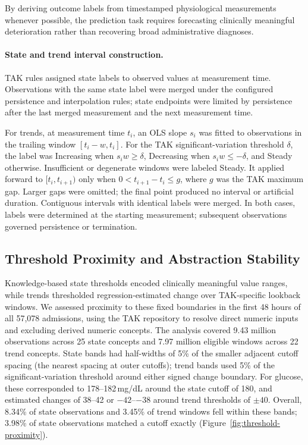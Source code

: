 By deriving outcome labels from timestamped physiological measurements whenever possible, the prediction task requires forecasting clinically meaningful deterioration rather than recovering broad administrative diagnoses.

\paragraph{State and trend interval construction.}
\label{app:abstraction-construction}
TAK rules assigned state labels to observed values at measurement time. Observations with the same state label were merged under the configured persistence and interpolation rules; state endpoints were limited by persistence after the last merged measurement and the next measurement time.

For trends, at measurement time $t_i$, an OLS slope $s_i$ was fitted to observations in the trailing window $[t_i-w,t_i]$. For the TAK significant-variation threshold $\delta$, the label was Increasing when $s_iw\ge\delta$, Decreasing when $s_iw\le-\delta$, and Steady otherwise. Insufficient or degenerate windows were labeled Steady. It applied forward to $[t_i,t_{i+1})$ only when $0<t_{i+1}-t_i\le g$, where $g$ was the TAK maximum gap. Larger gaps were omitted; the final point produced no interval or artificial duration. Contiguous intervals with identical labels were merged. In both cases, labels were determined at the starting measurement; subsequent observations governed persistence or termination.

\subsection{Threshold Proximity and Abstraction Stability}
\label{app:threshold-proximity}

Knowledge-based state thresholds encoded clinically meaningful value ranges, while trends thresholded regression-estimated change over TAK-specific lookback windows. We assessed proximity to these fixed boundaries in the first 48 hours of all 57,078 admissions, using the TAK repository to resolve direct numeric inputs and excluding derived numeric concepts. The analysis covered 9.43 million observations across 25 state concepts and 7.97 million eligible windows across 22 trend concepts. State bands had half-widths of 5\% of the smaller adjacent cutoff spacing (the nearest spacing at outer cutoffs); trend bands used 5\% of the significant-variation threshold around either signed change boundary. For glucose, these corresponded to 178--182\,mg/dL around the state cutoff of 180, and estimated changes of 38--42 or $-42$--$-38$ around trend thresholds of $\pm40$. Overall, 8.34\% of state observations and 3.45\% of trend windows fell within these bands; 3.98\% of state observations matched a cutoff exactly (Figure~\ref{fig:threshold-proximity}).

